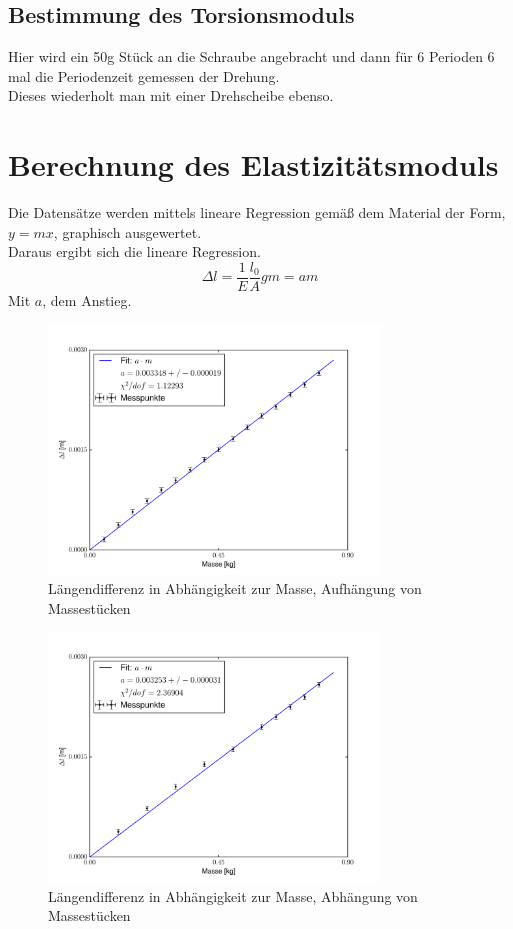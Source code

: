 \documentclass[bibliography=totocnumbered]{scrartcl}
\begin{document}
	\subsection{Bestimmung des Torsionsmoduls}
	Hier wird ein 50g Stück an die Schraube angebracht und dann für 6 Perioden 6 mal die Periodenzeit gemessen der Drehung.\\
	Dieses wiederholt man mit einer Drehscheibe ebenso.
	
	
	\newpage
	\section{Berechnung des Elastizitätsmoduls}
	Die Datensätze werden mittels lineare Regression gemäß dem Material \cite{MullerPG.2007b} der Form, $ y=mx $, graphisch ausgewertet.\\
	Daraus ergibt sich die lineare Regression.
	\begin{equation}\label{eq: lin Regr}
		\Delta l=\dfrac{1}{E}\dfrac{l_{0}}{A}gm=am
	\end{equation}
	Mit $ a $, dem Anstieg.
	
	\begin{figure}[!ht]
		\centering								 
		\includegraphics[width=250pt]{fotos/gpr1/M3_B_MR1.pdf}			 
		\caption[Messreihe 1, Platz 3]{Längendifferenz in Abhängigkeit zur Masse, Aufhängung von Massestücken}							 
		\label{Abb: M1, P3}							 
	\end{figure}
	
	\begin{figure}[!ht]
		\centering								 
		\includegraphics[width=250pt]{fotos/gpr1/M3_B_MR2.pdf}			 
		\caption[Messreihe 2, Platz 3]{Längendifferenz in Abhängigkeit zur Masse, Abhängung von Massestücken}							 
		\label{Abb: M2, P3}							 
	\end{figure}
	
\end{document}
